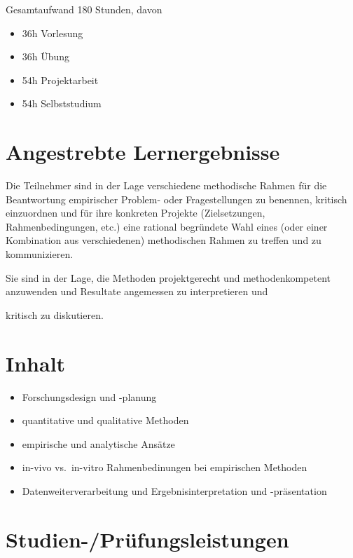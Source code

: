 Gesamtaufwand 180 Stunden, davon

\begin{itemize}
\tightlist
\item
  36h Vorlesung
\item
  36h Übung
\item
  54h Projektarbeit
\item
  54h Selbststudium
\end{itemize}

\section*{Angestrebte
Lernergebnisse\label{/mi-2017/modulbeschreibungen-master/MA_All_Research_Methods}}\label{angestrebte-lernergebnissepathlabelmi-2017modulbeschreibungen-mastermaux5fallux5fresearchux5fmethods}

Die Teilnehmer sind in der Lage verschiedene methodische Rahmen für die
Beantwortung empirischer Problem- oder Fragestellungen zu benennen,
kritisch einzuordnen und für ihre konkreten Projekte (Zielsetzungen,
Rahmenbedingungen, etc.) eine rational begründete Wahl eines (oder einer
Kombination aus verschiedenen) methodischen Rahmen zu treffen und zu
kommunizieren.

Sie sind in der Lage, die Methoden projektgerecht und methodenkompetent
anzuwenden und Resultate angemessen zu interpretieren und

kritisch zu diskutieren.

\section*{Inhalt\label{/mi-2017/modulbeschreibungen-master/MA_All_Research_Methods}}\label{inhaltpathlabelmi-2017modulbeschreibungen-mastermaux5fallux5fresearchux5fmethods}

\begin{itemize}
\tightlist
\item
  Forschungsdesign und -planung
\item
  quantitative und qualitative Methoden
\item
  empirische und analytische Ansätze
\item
  in-vivo vs.~in-vitro Rahmenbedinungen bei empirischen Methoden
\item
  Datenweiterverarbeitung und Ergebnisinterpretation und -präsentation
\end{itemize}

\section*{Studien-/Prüfungsleistungen\label{/mi-2017/modulbeschreibungen-master/MA_All_Research_Methods}}\label{studien-pruxfcfungsleistungenpathlabelmi-2017modulbeschreibungen-mastermaux5fallux5fresearchux5fmethods}

